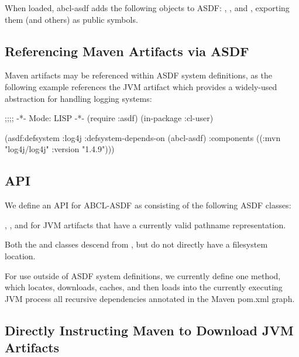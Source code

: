 \documentclass[10pt]{book}
\begin{document}


When loaded, abcl-asdf adds the following objects to \textsc{ASDF}:
, ,  and
, exporting them (and others) as public symbols.

\subsection{Referencing Maven Artifacts via ASDF}

Maven artifacts may be referenced within \textsc{ASDF} system
definitions, as the following example references the
 JVM artifact which provides a widely-used
abstraction for handling logging systems:

\begin{listing-lisp}
  ;;;; -*- Mode: LISP -*-
  (require :asdf)
  (in-package :cl-user)

  (asdf:defsystem :log4j
     :defsystem-depends-on (abcl-asdf)
     :components ((:mvn "log4j/log4j" :version "1.4.9")))
\end{listing-lisp}

\subsection{API}

We define an API for \textsc{ABCL-ASDF} as consisting of the following
\textsc{ASDF} classes:

, , and
 for JVM artifacts that have a currently
valid pathname representation.

Both the  and  classes descend from
, but do not directly have a filesystem location.

For use outside of ASDF system definitions, we currently define one
method,  which locates,
downloads, caches, and then loads into the currently executing JVM
process all recursive dependencies annotated in the Maven pom.xml
graph.

\subsection{Directly Instructing Maven to Download JVM Artifacts}
\end{document}

